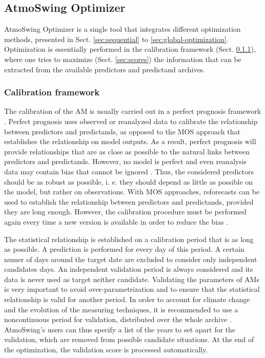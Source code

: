 \documentclass[review]{elsarticle}
\begin{document}
\subsection{AtmoSwing Optimizer}
\label{sec:optimizer}

AtmoSwing Optimizer is a single tool that integrates different optimization methods, presented in Sect. \ref{sec:sequential} to \ref{sec:global-optimization}. Optimization is essentially performed in the calibration framework (Sect. \ref{sec:calibration-framework}), where one tries to maximize (Sect. \ref{sec:scores}) the information that can be extracted from the available predictors and predictand archives.


\subsubsection{Calibration framework}
\label{sec:calibration-framework}

The calibration of the AM is usually carried out in a perfect prognosis \citep{Klein1959} framework \citep{Bontron2004, BenDaoud2010}. Perfect prognosis uses observed or reanalyzed data to calibrate the relationship between predictors and predictands, as opposed to the MOS approach that establishes the relationship on model outputs. As a result, perfect prognosis will provide relationships that are as close as possible to the natural links between predictors and predictands. However, no model is perfect and even reanalysis data may contain bias that cannot be ignored \citep{Dayon2015, Horton2018b}. Thus, the considered predictors should be as robust as possible, i. e. they should depend as little as possible on the model, but rather on observations. With MOS approaches, reforecasts can be used to establish the relationship between predictors and predictands, provided they are long enough. However, the calibration procedure must be performed again every time a new version is available in order to reduce the bias \citep{Wilson2002}.

The statistical relationship is established on a calibration period that is as long as possible. A prediction is performed for every day of this period. A certain numer of days around the target date are excluded to consider only independent candidates days. An independent validation period is always considered and its data is never used as target neither candidate. Validating the parameters of AMs is very important to avoid over-parametrization and to ensure that the statistical relationship is valid for another period. In order to account for climate change and the evolution of the measuring techniques, it is recommended to use a noncontinuous period for validation, distributed over the whole archive \citep{BenDaoud2010, Horton2018b}. AtmoSwing's users can thus specify a list of the years to set apart for the validation, which are removed from possible candidate situations. At the end of the optimization, the validation score is processed automatically.
\end{document}
